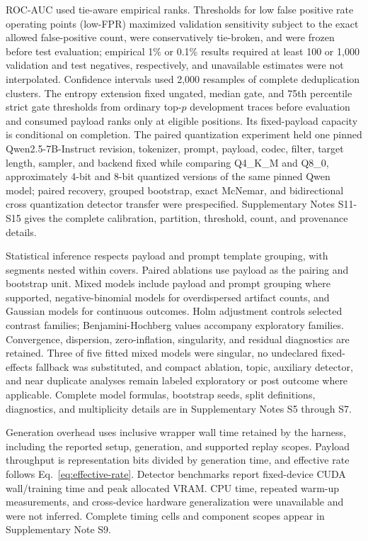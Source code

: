 \documentclass[fleqn,10pt]{wlscirep}
\begin{document}
ROC-AUC used tie-aware empirical ranks. Thresholds for low false positive rate operating points (low-FPR) maximized validation sensitivity subject to the exact allowed false-positive count, were conservatively tie-broken, and were frozen before test evaluation; empirical 1\% or 0.1\% results required at least 100 or 1,000 validation and test negatives, respectively, and unavailable estimates were not interpolated. Confidence intervals used 2,000 resamples of complete deduplication clusters. The entropy extension fixed ungated, median gate, and 75th percentile strict gate thresholds from ordinary top-\(p\) development traces before evaluation and consumed payload ranks only at eligible positions. Its fixed-payload capacity is conditional on completion. The paired quantization experiment held one pinned Qwen2.5-7B-Instruct revision, tokenizer, prompt, payload, codec, filter, target length, sampler, and backend fixed while comparing Q4\_K\_M and Q8\_0, approximately 4-bit and 8-bit quantized versions of the same pinned Qwen model; paired recovery, grouped bootstrap, exact McNemar, and bidirectional cross quantization detector transfer were prespecified. Supplementary Notes S11-S15 gives the complete calibration, partition, threshold, count, and provenance details.


Statistical inference respects payload and prompt template grouping, with segments nested within covers. Paired ablations use payload as the pairing and bootstrap unit. Mixed models include payload and prompt grouping where supported, negative-binomial models for overdispersed artifact counts, and Gaussian models for continuous outcomes\cite{Bates2015lme4,Brooks2017glmmTMB}. Holm adjustment controls selected contrast families; Benjamini-Hochberg values accompany exploratory families. Convergence, dispersion, zero-inflation, singularity, and residual diagnostics are retained. Three of five fitted mixed models were singular, no undeclared fixed-effects fallback was substituted, and compact ablation, topic, auxiliary detector, and near duplicate analyses remain labeled exploratory or post outcome where applicable. Complete model formulas, bootstrap seeds, split definitions, diagnostics, and multiplicity details are in Supplementary Notes S5 through S7.

Generation overhead uses inclusive wrapper wall time retained by the harness, including the reported setup, generation, and supported replay scopes. Payload throughput is representation bits divided by generation time, and effective rate follows Eq.~\eqref{eq:effective-rate}. Detector benchmarks report fixed-device CUDA wall/training time and peak allocated VRAM. CPU time, repeated warm-up measurements, and cross-device hardware generalization were unavailable and were not inferred. Complete timing cells and component scopes appear in Supplementary Note S9.
\end{document}
